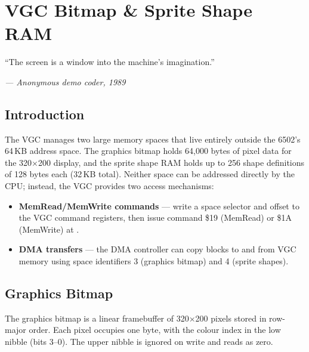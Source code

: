 \chapter{VGC Bitmap \& Sprite Shape RAM}

\epigraph{``The screen is a window into the machine's imagination.''}%
{\textit{--- Anonymous demo coder, 1989}}

\section*{Introduction}

The VGC manages two large memory spaces that live entirely outside the 6502's
64\,KB address space.  The graphics bitmap holds 64,000 bytes of pixel data for
the 320$\times$200 display, and the sprite shape RAM holds up to 256 shape
definitions of 128 bytes each (32\,KB total).  Neither space can be addressed
directly by the CPU; instead, the VGC provides two access mechanisms:

\begin{itemize}
  \item \textbf{MemRead/MemWrite commands} --- write a space selector and offset
        to the VGC command registers, then issue command \$19 (MemRead) or \$1A
        (MemWrite) at .
  \item \textbf{DMA transfers} --- the DMA controller can copy blocks to and
        from VGC memory using space identifiers 3 (graphics bitmap) and 4
        (sprite shapes).
\end{itemize}


\section{Graphics Bitmap}
\label{sec:gfx-bitmap}

The graphics bitmap is a linear framebuffer of 320$\times$200 pixels stored in
row-major order.  Each pixel occupies one byte, with the colour index in the low
nibble (bits 3--0).  The upper nibble is ignored on write and reads as zero.

